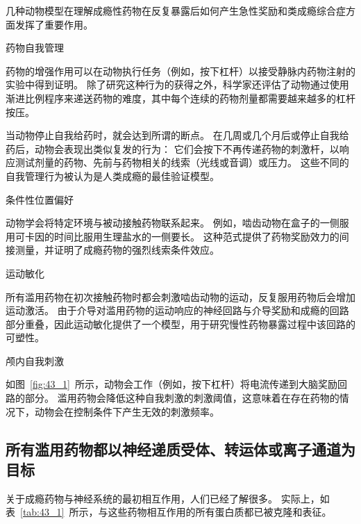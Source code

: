 \begin{proposition}[药物成瘾的动物模型] \label{box:43_1}
	
	\quad \quad 几种动物模型在理解成瘾性药物在反复暴露后如何产生急性奖励和类成瘾综合症方面发挥了重要作用。
	
	\quad \quad \textcolor[HTML]{00A652}{药物自我管理}
	
	\quad \quad 药物的增强作用可以在动物执行任务（例如，按下杠杆）以接受静脉内药物注射的实验中得到证明。
	除了研究这种行为的获得之外，科学家还评估了动物通过使用渐进比例程序来递送药物的难度，其中每个连续的药物剂量都需要越来越多的杠杆按压。
	
	\quad \quad 当动物停止自我给药时，就会达到所谓的断点。
	在几周或几个月后或停止自我给药后，动物会表现出类似复发的行为：
	它们会按下不再传递药物的刺激杆，以响应测试剂量的药物、先前与药物相关的线索（光线或音调）或压力。
	这些不同的自我管理行为被认为是人类成瘾的最佳验证模型。
	
	\quad \quad \textcolor[HTML]{00A652}{条件性位置偏好}
	
	\quad \quad 动物学会将特定环境与被动接触药物联系起来。
	例如，啮齿动物在盒子的一侧服用可卡因的时间比服用生理盐水的一侧要长。
	这种范式提供了药物奖励效力的间接测量，并证明了成瘾药物的强烈线索条件效应。
	
	\quad \quad \textcolor[HTML]{00A652}{运动敏化}
	
	\quad \quad 所有滥用药物在初次接触药物时都会刺激啮齿动物的运动，反复服用药物后会增加运动激活。
	由于介导对滥用药物的运动响应的神经回路与介导奖励和成瘾的回路部分重叠，因此运动敏化提供了一个模型，用于研究慢性药物暴露过程中该回路的可塑性。
	
	\quad \quad \textcolor[HTML]{00A652}{颅内自我刺激}
	
	\quad \quad 如图~\ref{fig:43_1}~所示，动物会工作（例如，按下杠杆）将电流传递到大脑奖励回路的部分。
	滥用药物会降低这种自我刺激的刺激阈值，这意味着在存在药物的情况下，动物会在控制条件下产生无效的刺激频率。
	
\end{proposition}



\subsection{所有滥用药物都以神经递质受体、转运体或离子通道为目标}

关于成瘾药物与神经系统的最初相互作用，人们已经了解很多。
实际上，如表~\ref{tab:43_1}~所示，与这些药物相互作用的所有蛋白质都已被克隆和表征。


